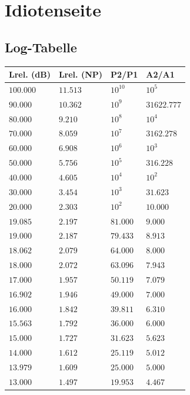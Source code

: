 \section{Idiotenseite}
\subsection{Log-Tabelle}\label{log_tabelle}
\begin{center}
	\parbox{7cm}{
		\scriptsize
	\begin{tabular}{l|l|l|l}
		\textbf{Lrel. (dB)} & \textbf{Lrel. (NP)} & \textbf{P2/P1} & \textbf{A2/A1} \\ \toprule
		$100.000$ & $11.513$ & $10^{10}$ & $10^5$ \\ \hline
		$90.000$ & $10.362$ & $10^9$ & $31622.777$ \\ \hline
		$80.000$ & $9.210$ & $10^8$ & $10^4$ \\ \hline
		$70.000$ & $8.059$ & $10^7$ & $3162.278$ \\ \hline
		$60.000$ & $6.908$ & $10^6$ & $10^3$ \\ \hline
		$50.000$ & $5.756$ & $10^5$ & $316.228$ \\ \hline
		$40.000$ & $4.605$ & $10^4$ & $10^2$ \\ \hline
		$30.000$ & $3.454$ & $10^3$ & $31.623$ \\ \hline
		\textbf{$20.000$} & $2.303$ & \textbf{$10^2$} & \textbf{$10.000$} \\ \hline
		$19.085$ & $2.197$ & $81.000$ & $9.000$ \\ \hline
		$19.000$ & $2.187$ & $79.433$ & $8.913$ \\ \hline
		$18.062$ & $2.079$ & $64.000$ & $8.000$ \\ \hline
		$18.000$ & $2.072$ & $63.096$ & $7.943$ \\ \hline
		$17.000$ & $1.957$ & $50.119$ & $7.079$ \\ \hline
		$16.902$ & $1.946$ & $49.000$ & $7.000$ \\ \hline
		$16.000$ & $1.842$ & $39.811$ & $6.310$ \\ \hline
		$15.563$ & $1.792$ & $36.000$ & $6.000$ \\ \hline
		$15.000$ & $1.727$ & $31.623$ & $5.623$ \\ \hline
		$14.000$ & $1.612$ & $25.119$ & $5.012$ \\ \hline
		\textbf{$13.979$} & $1.609$ & \textbf{$25.000$} & \textbf{$5.000$} \\ \hline
		$13.000$ & $1.497$ & $19.953$ & $4.467$ \\ \hline

\end{tabular}}
\end{center}
